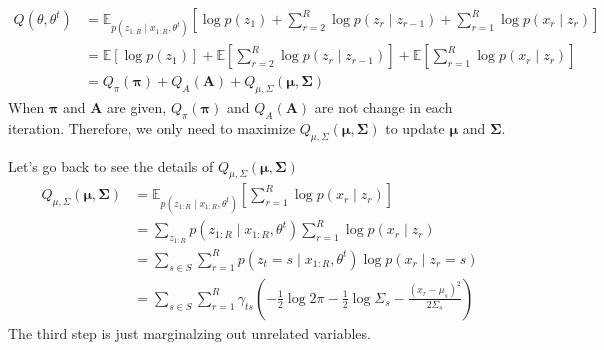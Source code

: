 \documentclass[12pt]{article}
\newenvironment{problem}[2][Problem]{\begin{trivlist}
\item[\hskip \labelsep {\bfseries #1}\hskip \labelsep {\bfseries #2.}]}{\end{trivlist}}
\begin{document}
\begin{problem}{2.6.18}
\begin{align*}
    Q(\theta, \theta^{t}) &= 
    \mathbb{E}_{p(z_{1:R}\mid x_{1:R}, \theta^{t})}[
        \log p(z_1) + \sum_{r=2}^{R} \log p(z_r \mid z_{r-1}) 
        + \sum_{r=1}^{R} \log p(x_r\mid z_r)] \\
    &= \mathbb{E}[\log p(z_1)] 
        + \mathbb{E}[\sum_{r=2}^{R} \log p(z_r \mid z_{r-1})] 
        + \mathbb{E}[\sum_{r=1}^{R} \log p(x_r\mid z_r)] \\
    &= Q_{\pi}(\bm{\pi}) + Q_{A}(\bm{A}) + Q_{\mu, \Sigma}(\bm{\mu}, \bm{\Sigma})
\end{align*}
When $\bm{\pi}$ and $\bm{A}$ are given, $Q_{\pi}(\bm{\pi})$ and $Q_{A}(\bm{A})$ 
are not change in each iteration. Therefore, we only need to maximize 
$Q_{\mu, \Sigma}(\bm{\mu}, \bm{\Sigma})$ to update $\bm{\mu}$ and $\bm{\Sigma}$.

Let's go back to see the details of $Q_{\mu, \Sigma}(\bm{\mu}, \bm{\Sigma})$ 
\begin{align*}
    Q_{\mu, \Sigma}(\bm{\mu}, \bm{\Sigma}) 
    &= \mathbb{E}_{p(z_{1:R}\mid x_{1:R}, \theta^{t})}[\sum_{r=1}^{R} \log p(x_r\mid z_r)] \\
    &= \sum_{z_{1:R}}p(z_{1:R}\mid x_{1:R}, \theta^{t})\sum_{r=1}^{R} \log p(x_r\mid z_r) \\
    &= \sum_{s\in S}\sum_{r=1}^{R} p(z_{t} = s\mid x_{1:R}, \theta^{t})\log p(x_r\mid z_r = s) \\
    &= \sum_{s\in S}\sum_{r=1}^{R} \gamma_{ts}
        (-\frac{1}{2}\log 2\pi -\frac{1}{2}\log \Sigma_s - \frac{(x_r - \mu_s)^2}{2\Sigma_s})
\end{align*}
The third step is just marginalzing out unrelated variables.

\end{problem}
\pagebreak
\end{document}
